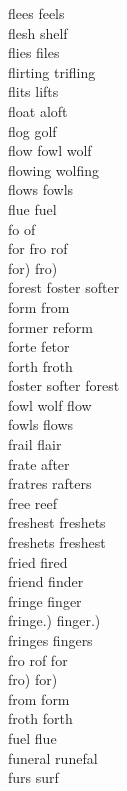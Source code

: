 flees feels\\
flesh shelf\\
flies files\\
flirting trifling\\
flits lifts\\
float aloft\\
flog golf\\
flow fowl wolf\\
flowing wolfing\\
flows fowls\\
flue fuel\\
fo of\\
for fro rof\\
for) fro)\\
forest foster softer\\
form from\\
former reform\\
forte fetor\\
forth froth\\
foster softer forest\\
fowl wolf flow\\
fowls flows\\
frail flair\\
frate after\\
fratres rafters\\
free reef\\
freshest freshets\\
freshets freshest\\
fried fired\\
friend finder\\
fringe finger\\
fringe.) finger.)\\
fringes fingers\\
fro rof for\\
fro) for)\\
from form\\
froth forth\\
fuel flue\\
funeral runefal\\
furs surf\\

